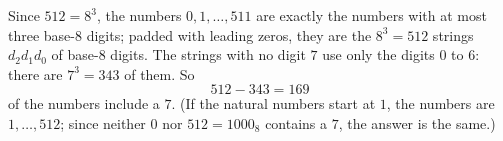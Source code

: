 Since $512=8^3$, the numbers $0,1,\dots,511$ are exactly the numbers with at most three base-$8$ digits; padded with leading zeros, they are the $8^3=512$ strings $d_2d_1d_0$ of base-$8$ digits. The strings with no digit $7$ use only the digits $0$ to $6$: there are $7^3=343$ of them. So
\[
512-343=\boxed{169}
\]
of the numbers include a $7$. (If the natural numbers start at $1$, the numbers are $1,\dots,512$; since neither $0$ nor $512=1000_8$ contains a $7$, the answer is the same.)

